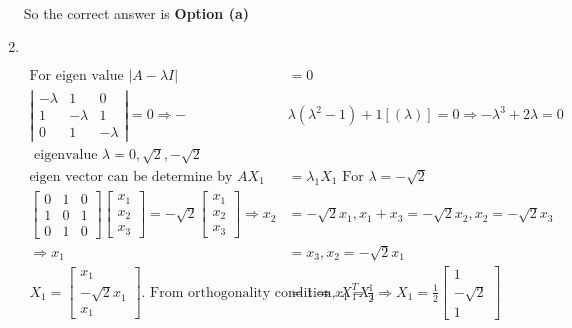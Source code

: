 \begin{enumerate}
\begin{answer}
\begin{align*}
		\end{align*}
			So the correct answer is \textbf{Option (a)}
	\end{answer}
	\item $\left. \right. $
	\begin{answer}
		\begin{align*}
		 \text{For eigen value }|A-\lambda I|&=0\\
		\left|\begin{array}{ccc}
		-\lambda & 1 & 0 \\
		1 & -\lambda & 1 \\
		0 & 1 & -\lambda
		\end{array}\right|=0 \Rightarrow-&\lambda\left(\lambda^{2}-1\right)+1[(\lambda)]=0 \Rightarrow-\lambda^{3}+2 \lambda=0\\
	\text{	eigenvalue }\lambda=0, \sqrt{2},-\sqrt{2}\\
		\text{eigen vector can be determine by }A X_{1}&=\lambda_{1} X_{1}
	\text{	For }\lambda=-\sqrt{2}\\
		\left[\begin{array}{lll}
		0 & 1 & 0 \\
		1 & 0 & 1 \\
		0 & 1 & 0
		\end{array}\right]\left[\begin{array}{l}
		x_{1} \\
		x_{2} \\
		x_{3}
		\end{array}\right]=-\sqrt{2}\left[\begin{array}{l}
		x_{1} \\
		x_{2} \\
		x_{3}
		\end{array}\right] \Rightarrow x_{2}&=-\sqrt{2} x_{1}, x_{1}+x_{3}=-\sqrt{2} x_{2}, x_{2}=-\sqrt{2} x_{3}\\
		\Rightarrow x_{1}&=x_{3}, x_{2}=-\sqrt{2} x_{1}\\
		X_{1}=\left[\begin{array}{c}x_{1} \\ -\sqrt{2} x_{1} \\ x_{1}\end{array}\right] \text{. From orthogonality condition, }X_{1}^{T} X_{1}&=1 \Rightarrow x_{1}=\frac{1}{2} \Rightarrow X_{1}=\frac{1}{2}\left[\begin{array}{c}1 \\ -\sqrt{2} \\ 1\end{array}\right]\\

\end{align*}
\end{answer}
\end{enumerate}
